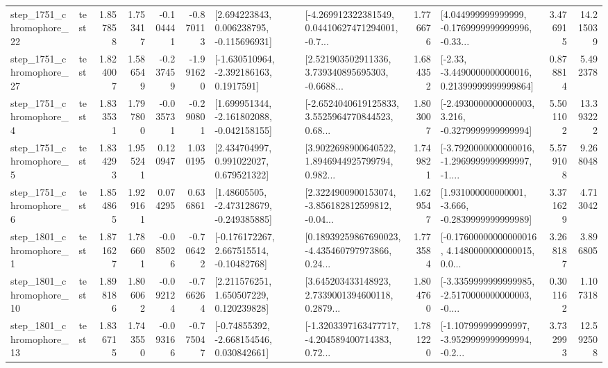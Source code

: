 \begin{tabular}{llrrrrllrlrr}
 step\_1751\_chromophore\_22 &      test &      1.857858 &    1.753417 &     -0.104441 & -0.870113 &    [2.694223843, 0.006238795, -0.115696931] &  [-4.269912322381549, 0.04410627471294001, -0.7... &       1.776676 &  [4.044999999999999, -0.1769999999999996, -0.33... &            3.476915 &         14.215039 \\
 step\_1751\_chromophore\_27 &      test &      1.824007 &    1.586549 &     -0.237459 & -1.991620 &     [-1.630510964, -2.392186163, 0.1917591] &  [2.521903502911336, 3.739340895695303, -0.6688... &       1.684352 &  [-2.33, -3.4490000000000016, 0.21399999999999864] &            0.878814 &          5.492378 \\
  step\_1751\_chromophore\_4 &      test &      1.833531 &    1.797800 &     -0.035731 & -0.290801 &   [1.699951344, -2.161802088, -0.042158155] &  [-2.6524040619125833, 3.5525964770844523, 0.68... &       1.803007 &  [-2.4930000000000003, 3.216, -0.3279999999999994] &            5.501102 &         13.393222 \\
  step\_1751\_chromophore\_5 &      test &      1.834293 &    1.955241 &      0.120947 &  1.030195 &     [2.434704997, 0.991022027, 0.679521322] &  [3.9022698900640522, 1.8946944925799794, 0.982... &       1.749821 &  [-3.7920000000000016, -1.2969999999999997, -1.... &            5.579108 &          9.268048 \\
  step\_1751\_chromophore\_6 &      test &      1.854865 &    1.929161 &      0.074295 &  0.636861 &    [1.48605505, -2.473128679, -0.249385885] &  [2.3224900900153074, -3.856182812599812, -0.04... &       1.629547 &   [1.931000000000001, -3.666, -0.2839999999999989] &            3.371629 &          4.713042 \\
  step\_1801\_chromophore\_1 &      test &      1.871627 &    1.786601 &     -0.085026 & -0.706422 &    [-0.176172267, 2.667515514, -0.10482768] &  [0.18939259867690023, -4.435460797973866, 0.24... &       1.773584 &  [-0.17600000000000016, 4.1480000000000015, 0.0... &            3.268187 &          3.896805 \\
 step\_1801\_chromophore\_10 &      test &      1.898186 &    1.806062 &     -0.092124 & -0.766264 &     [2.211576251, 1.650507229, 0.120239828] &  [3.645203433148923, 2.7339001394600118, 0.2879... &       1.804760 &  [-3.3359999999999985, -2.5170000000000003, -0.... &            0.301162 &          1.107318 \\
 step\_1801\_chromophore\_13 &      test &      1.836715 &    1.743550 &     -0.093166 & -0.775047 &    [-0.74855392, -2.668154546, 0.030842661] &  [-1.3203397163477717, -4.204589400714383, 0.72... &       1.781220 &  [-1.107999999999997, -3.9529999999999994, -0.2... &            3.732993 &         12.592508 \\

\end{tabular}
